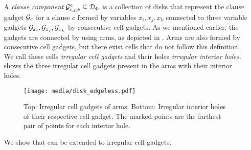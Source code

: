 \begin{toappendix}
\begin{toappendix}
A \emph{clause component} $\mathcal{G}^c_{i,j,k} \subseteq \mathcal{D}_\Phi$ is a collection of disks that represent the clause gadget $\mathcal{G}_c$ for a clause $c$ formed by variables $x_i,x_j,x_k$ connected to three variable gadgets $\mathcal{G}_{x_i},\mathcal{G}_{x_j},\mathcal{G}_{x_k}$ by consecutive cell gadgets.
As we mentioned earlier, the gadgets are connected by using arms, as depicted in .
Arms are also formed by consecutive cell gadgets, but there exist cells that do not follow this definition.
We call these cells \emph{irregular cell gadgets} and their holes \emph{irregular interior holes}.
 shows the three irregular cell gadgets present in the arms with their interior holes.


\begin{figure}[!htb]
    \centering
    \texttt{[image: media/disk\_edgeless.pdf]}
    \caption{Top: Irregular cell gadgets of arms; Bottom: Irregular interior holes of their respective cell gadget. The marked points are the farthest pair of points for each interior hole.}
    \label{fig:irreg_interior_holes}
\end{figure}

We show that  can be extended to irregular cell gadgets.


\end{toappendix}
\end{toappendix}
